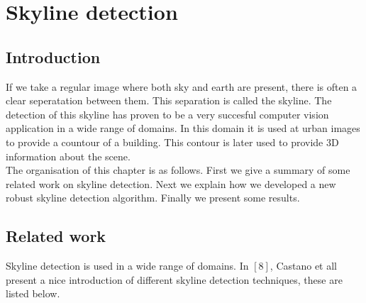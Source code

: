 

\section{Skyline detection}
 \subsection{Introduction}
If we take a regular image where both sky and earth are present, there
is often a clear seperatation between them. This separation is called the
skyline. %
The detection of this skyline has proven to be a very succesful computer vision
application in a wide range of domains. In this domain it is used at urban
images to provide a countour of a building. This contour is later used to
provide 3D information about the scene.\\
The organisation of this chapter is as follows.  First we give a summary of some
related work on skyline detection.  Next we explain how we developed a new
robust skyline detection algorithm.  Finally we present some results.

\subsection{Related work}
Skyline detection is used in a wide range of domains.
In $[8]$, Castano et all present a nice introduction of different skyline
detection techniques, these are listed below.


